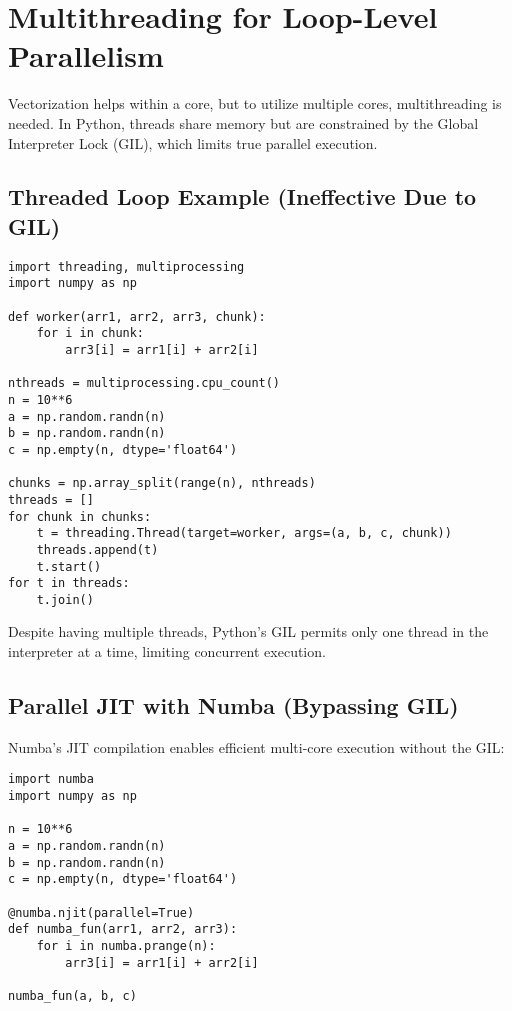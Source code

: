 \documentclass{book}
\begin{document}
\section{Multithreading for Loop-Level Parallelism}

Vectorization helps within a core, but to utilize multiple cores, multithreading is needed. In Python, threads share memory but are constrained by the Global Interpreter Lock (GIL), which limits true parallel execution.

\subsection{Threaded Loop Example (Ineffective Due to GIL)}

\begin{lstlisting}
import threading, multiprocessing
import numpy as np

def worker(arr1, arr2, arr3, chunk):
    for i in chunk:
        arr3[i] = arr1[i] + arr2[i]

nthreads = multiprocessing.cpu_count()
n = 10**6
a = np.random.randn(n)
b = np.random.randn(n)
c = np.empty(n, dtype='float64')

chunks = np.array_split(range(n), nthreads)
threads = []
for chunk in chunks:
    t = threading.Thread(target=worker, args=(a, b, c, chunk))
    threads.append(t)
    t.start()
for t in threads:
    t.join()
\end{lstlisting}

Despite having multiple threads, Python's GIL permits only one thread in the interpreter at a time, limiting concurrent execution.

\subsection{Parallel JIT with Numba (Bypassing GIL)}

Numba's JIT compilation enables efficient multi-core execution without the GIL:

\begin{lstlisting}
import numba
import numpy as np

n = 10**6
a = np.random.randn(n)
b = np.random.randn(n)
c = np.empty(n, dtype='float64')

@numba.njit(parallel=True)
def numba_fun(arr1, arr2, arr3):
    for i in numba.prange(n):
        arr3[i] = arr1[i] + arr2[i]

numba_fun(a, b, c)
\end{lstlisting}
\end{document}
